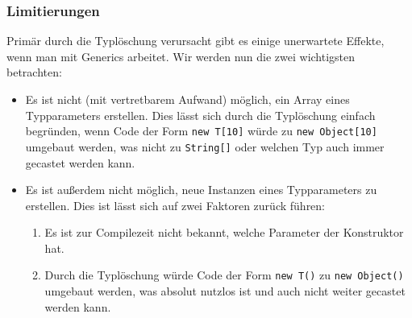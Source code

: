 	\subsubsection{Limitierungen}
		Primär durch die Typlöschung verursacht gibt es einige unerwartete Effekte, wenn man mit Generics arbeitet. Wir werden nun die zwei wichtigsten betrachten:
		\begin{itemize}
			\item Es ist nicht (mit vertretbarem Aufwand) möglich, ein Array eines Typparameters erstellen. Dies lässt sich durch die Typlöschung einfach begründen, wenn Code der Form \texttt{new T[10]} würde zu \texttt{new Object[10]} umgebaut werden, was nicht zu \texttt{String[]} oder welchen Typ auch immer gecastet werden kann.
			\item Es ist außerdem nicht möglich, neue Instanzen eines Typparameters zu erstellen. Dies ist lässt sich auf zwei Faktoren zurück führen:
				\begin{enumerate}
					\item Es ist zur Compilezeit nicht bekannt, welche Parameter der Konstruktor hat.
					\item Durch die Typlöschung würde Code der Form \texttt{new T()} zu \texttt{new Object()} umgebaut werden, was absolut nutzlos ist und auch nicht weiter gecastet werden kann.
				\end{enumerate}
		\end{itemize}
